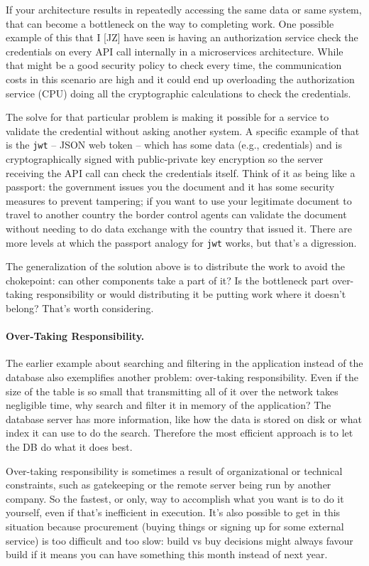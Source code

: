 If your architecture results in repeatedly accessing the same data or same system, that can become a bottleneck on the way to completing work. One possible example of this that I [JZ] have seen is having an authorization service check the credentials on every API call internally in a microservices architecture. While that might be a good security policy to check every time, the communication costs in this scenario are high and it could end up overloading the authorization service (CPU) doing all the cryptographic calculations to check the credentials.

The solve for that particular problem is making it possible for a service to validate the credential without asking another system. A specific example of that is the \texttt{jwt} -- JSON web token -- which has some data (e.g., credentials) and is cryptographically signed with public-private key encryption so the server receiving the API call can check the credentials itself. Think of it as being like a passport: the government issues you the document and it has some security measures to prevent tampering; if you want to use your legitimate document to travel to another country the border control agents can validate the document without needing to do data exchange with the country that issued it. There are more levels at which the passport analogy for \texttt{jwt} works, but that's a digression.

The generalization of the solution above is to distribute the work to avoid the chokepoint: can other components take a part of it? Is the bottleneck part over-taking responsibility or would distributing it be putting work where it doesn't belong? That's worth considering.

\paragraph{Over-Taking Responsibility.}
The earlier example about searching and filtering in the application instead of the database also exemplifies another problem: over-taking responsibility. Even if the size of the table is so small that transmitting all of it over the network takes negligible time, why search and filter it in memory of the application? The database server has more information, like how the data is stored on disk or what index it can use to do the search. Therefore the most efficient approach is to let the DB do what it does best.

Over-taking responsibility is sometimes a result of organizational or technical constraints, such as gatekeeping or the remote server being run by another company. So the fastest, or only, way to accomplish what you want is to do it yourself, even if that's inefficient in execution. It's also possible to get in this situation because procurement (buying things or signing up for some external service) is too difficult and too slow: build vs buy decisions might always favour build if it means you can have something this month instead of next year.

